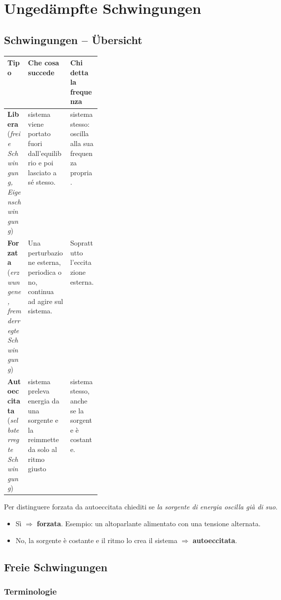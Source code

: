 \section{Ungedämpfte Schwingungen}

\subsection{Schwingungen -- Übersicht}

\begin{tabularx}{\linewidth}{>{\raggedright\arraybackslash}p{0.22\linewidth}
                >{\raggedright\arraybackslash}X
                >{\raggedright\arraybackslash}X}
\toprule
\textbf{Tipo} & \textbf{Che cosa succede} & \textbf{Chi detta la frequenza} \\
\midrule
\textbf{Libera} \newline (\textit{freie Schwingung, Eigenschwingung})
  & sistema viene portato fuori dall'equilibrio e poi lasciato a sé stesso.
  & sistema stesso: oscilla alla sua frequenza propria. \\
\addlinespace
\textbf{Forzata} \newline (\textit{erzwungene, fremderregte Schwingung})
  & Una perturbazione esterna, periodica o no, continua ad agire sul sistema.
  & Soprattutto l'eccitazione esterna. \\
\addlinespace
\textbf{Autoeccitata} \newline (\textit{selbsterregte Schwingung})
  & sistema preleva energia da una sorgente e la reimmette da solo al ritmo giusto
  & sistema stesso, anche se la sorgente è costante. \\
\bottomrule
\end{tabularx}\smallbreak

Per distinguere forzata da autoeccitata chiediti se \emph{la sorgente di energia oscilla già di suo}.
\begin{itemize}
  \item Sì $\Rightarrow$ \textbf{forzata}. Esempio: un altoparlante alimentato con una tensione alternata.
  \item No, la sorgente è costante e il ritmo lo crea il sistema $\Rightarrow$ \textbf{autoeccitata}.
\end{itemize}


\subsection{Freie Schwingungen}

\subsubsection{Terminologie}

